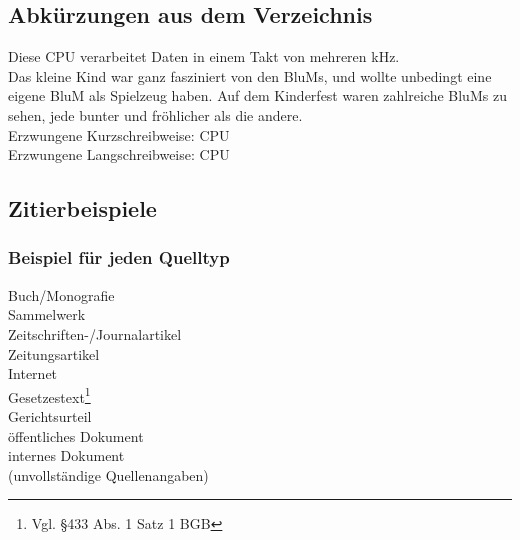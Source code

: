 
\subsection{Abkürzungen aus dem Verzeichnis}

Diese \ac{CPU} verarbeitet Daten in einem Takt von mehreren \ac{kHz}.\\
Das kleine Kind war ganz fasziniert von den \acp{BluM}, und wollte unbedingt eine eigene \ac{BluM} als Spielzeug haben. 
Auf dem Kinderfest waren zahlreiche \acp{BluM} zu sehen, jede bunter und fröhlicher als die andere.\\

Erzwungene Kurzschreibweise: \acs{CPU}\\
Erzwungene Langschreibweise: \acl{CPU}

\newpage
\subsection{Zitierbeispiele}
\subsubsection{Beispiel für jeden Quelltyp}%

Buch/Monografie\\
Sammelwerk\\
Zeitschriften-/Journalartikel\\
Zeitungsartikel\\
Internet\\%
Gesetzestext\footnote{Vgl. §433 Abs. 1 Satz 1 BGB}\nocite{bgb}\\
Gerichtsurteil\\
öffentliches Dokument\\
internes Dokument\\%
(unvollständige Quellenangaben)

